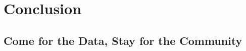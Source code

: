 \documentclass[
]{book}
\begin{document}
\hypertarget{part-conclusion}{%
\part*{Conclusion}\label{part-conclusion}}

\hypertarget{come-for-the-data-stay-for-the-community}{%
\chapter*{Come for the Data, Stay for the Community}\label{come-for-the-data-stay-for-the-community}}
\end{document}
